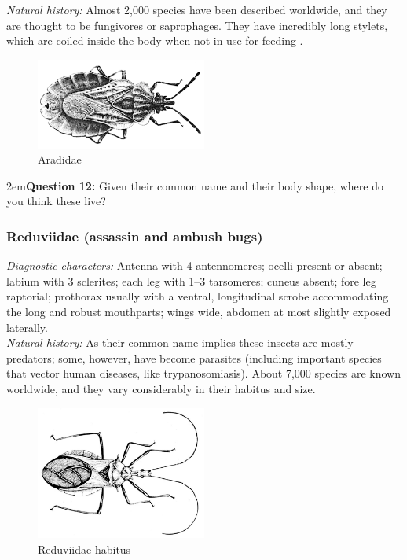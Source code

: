\documentclass[letterpaper, 11pt]{article}
\begin{document}
\noindent{}\textit{Natural history:} Almost 2,000 species have been described worldwide, and they are thought to be fungivores or saprophages. They have incredibly long stylets, which are coiled inside the body when not in use for feeding \citep{Spooner121}.\\%

\begin{figure}[ht!]
 \centering
 \includegraphics[width=0.5\textwidth]{aradidae.png}
 \caption{Aradidae \citep[][Fig. 28]{bhlitem49342}}
 \label{fig:aradid1}
\end{figure}

\hangindent2em\textbf{Question 12:} Given their common name and their body shape, where do you think these live?\\

\subsubsection{Reduviidae (assassin and ambush bugs)}
\noindent{}\textit{Diagnostic characters:} Antenna with 4 antennomeres; ocelli present or absent; labium with 3 sclerites; each leg with 1--3 tarsomeres; cuneus absent; fore leg raptorial; prothorax usually with a ventral, longitudinal scrobe accommodating the long and robust mouthparts; wings wide, abdomen at most slightly exposed laterally.\\

\noindent{}\textit{Natural history:} As their common name implies these insects are mostly predators; some, however, have become parasites (including important species that vector human diseases, like trypanosomiasis). About 7,000 species are known worldwide, and they vary considerably in their habitus and size.\\

\begin{figure}[ht!]
 \centering
 \includegraphics[width=0.5\textwidth]{ReduviidHabitus}
 \caption{Reduviidae habitus \citep[][Plate XXXII, Fig. 12]{bhl82061}}
 \label{fig:reduviid1}
\end{figure}
\end{document}
